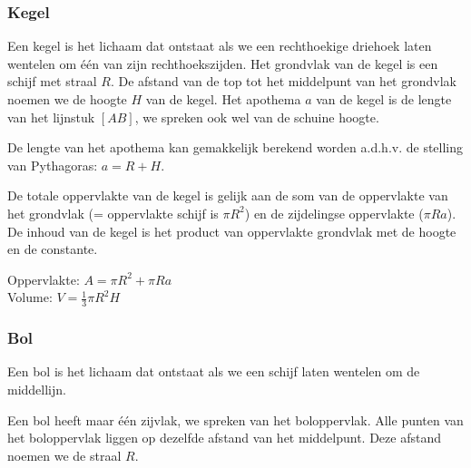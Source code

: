 \subsubsection{Kegel}
\begin{definitie}
	Een kegel is het lichaam dat ontstaat als we een rechthoekige driehoek laten wentelen om \'e\'en van zijn rechthoekszijden. Het grondvlak van de kegel is een schijf met straal $R$. De afstand van de top tot het middelpunt van het grondvlak noemen we de hoogte $H$ van de kegel. Het apothema $a$ van de kegel is de lengte van het lijnstuk $[AB]$, we spreken ook wel van de schuine hoogte.
\end{definitie}
De lengte van het apothema kan gemakkelijk berekend worden a.d.h.v. de stelling van Pythagoras: $a=R+H$.

De totale oppervlakte van de kegel is gelijk aan de som van de oppervlakte van het grondvlak (= oppervlakte schijf is $\pi R^2$) en de zijdelingse oppervlakte ($\pi R a$). De inhoud van de kegel is het product van oppervlakte grondvlak met de hoogte en de constante.




		
\begin{ftonthoud}
			Oppervlakte: $A=\pi R^2 + \pi R a$ 
		\\
		Volume: $V=\frac{1}{3}\pi R^2 H$
\end{ftonthoud}

\subsubsection{Bol}
\begin{definitie}
	Een bol is het lichaam dat ontstaat als we een schijf laten wentelen om de middellijn.
\end{definitie} Een bol heeft maar \'e\'en zijvlak, we spreken van het boloppervlak. 
Alle punten van het boloppervlak liggen op dezelfde afstand van het middelpunt. Deze afstand noemen we de straal $R$.


